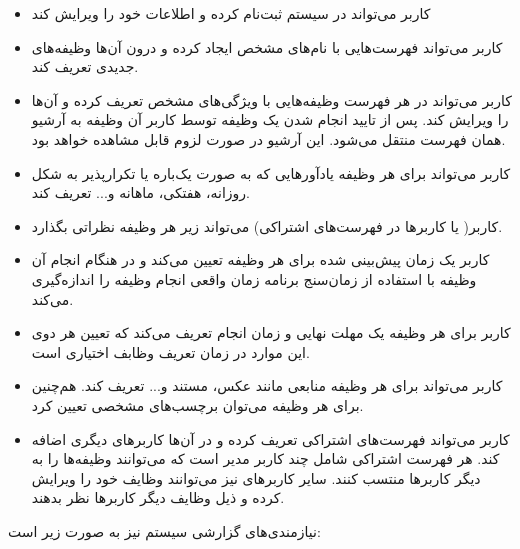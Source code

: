 \documentclass{article}
\begin{document}
\begin{itemize}

\item کاربر می‌تواند در سیستم ثبت‌نام کرده و اطلاعات خود را ویرایش کند

\item کاربر می‌تواند فهرست‌هایی  با نام‌‌های مشخص ایجاد کرده و درون آن‌‌ها وظیفه‌های جدیدی تعریف کند.

\item کاربر می‌تواند در هر فهرست‌ وظیفه‌هایی با ویژگی‌های مشخص تعریف کرده و آن‌ها را ویرایش کند. پس از تایید انجام شدن یک وظیفه توسط کاربر آن وظیفه به آرشیو همان فهرست منتقل می‌شود. این آرشیو در صورت لزوم قابل مشاهده خواهد بود.

\item کاربر می‌تواند برای هر وظیفه یاد‌آور‌هایی که به صورت یک‌باره یا تکرار‌پذیر به شکل روزانه، هفتکی، ماهانه و... تعریف کند.

\item کاربر( یا کاربرها در فهرست‌های اشتراکی) می‌تواند زیر هر وظیفه‌ نظر‌اتی بگذارد.

\item کاربر یک زمان پیش‌بینی شده برای هر وظیفه تعیین می‌کند و در هنگام انجام آن وظیفه با استفاده از زمان‌سنج برنامه زمان واقعی انجام وظیفه را اندازه‌گیری می‌کند.

\item کاربر برای هر وظیفه یک مهلت نهایی و زمان انجام تعریف می‌کند که تعیین هر دوی این موارد در زمان تعریف وظابف اختیاری است.

\item کاربر می‌تواند برای هر وظیفه منابعی مانند عکس، مستند و... تعریف کند. هم‌چنین برای هر وظیفه می‌توان برچسب‌های مشخصی تعیین کرد.

\item کاربر می‌تواند فهرست‌های اشتراکی تعریف کرده و در آن‌ها کاربر‌های دیگری اضافه کند. هر فهرست اشتراکی شامل چند کاربر مدیر است که می‌توانند وظیفه‌ها را به دیگر کاربر‌ها منتسب کنند. سایر کاربر‌های نیز می‌توانند وظایف خود را ویرایش کرده و ذیل وظایف دیگر کاربر‌ها نظر بدهند.

\end{itemize}

نیاز‌مندی‌های گزارشی سیستم نیز به صورت زیر است:
\end{document}
